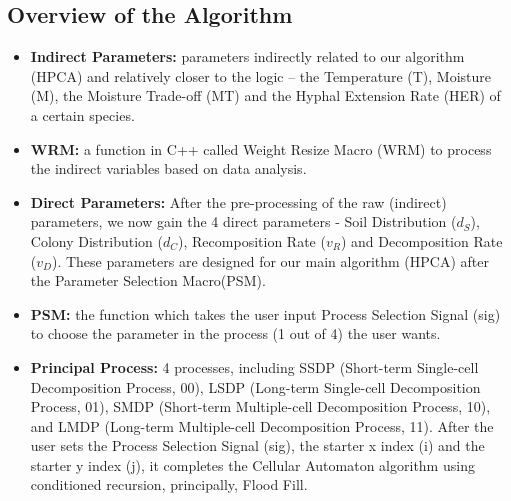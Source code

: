 \documentclass[12pt]{article}
\begin{document}
\subsection{Overview of the Algorithm}
\begin{itemize}
	\item \textbf{Indirect Parameters:} parameters indirectly related to our algorithm (HPCA) and relatively closer to the logic – the Temperature (T), Moisture (M), the Moisture Trade-off (MT) and the Hyphal Extension Rate (HER) of a certain species. 
	\item \textbf{WRM:} a function in C++ called Weight Resize Macro (WRM) to process the indirect variables based on data analysis.
	\item \textbf{Direct Parameters:} After the pre-processing of the raw (indirect) parameters, we now gain the 4 direct parameters - Soil Distribution ($d_S$), Colony Distribution ($d_C$), Recomposition Rate ($v_R$) and Decomposition Rate ($v_D$). These parameters are designed for our main algorithm (HPCA) after the Parameter Selection Macro(PSM).
	\item \textbf{PSM:} the function which takes the user input Process Selection Signal (sig) to choose the  parameter in the process (1 out of 4) the user wants. 
	\item \textbf{Principal Process:} 4 processes, including SSDP (Short-term Single-cell Decomposition Process, 00), LSDP (Long-term Single-cell Decomposition Process, 01), SMDP (Short-term Multiple-cell Decomposition Process, 10), and LMDP (Long-term Multiple-cell Decomposition Process, 11). After the user sets the Process Selection Signal (sig), the starter x index (i) and the starter y index (j), it completes the Cellular Automaton algorithm using conditioned recursion, principally, Flood Fill. 
	
	\end{itemize}
\end{document}

